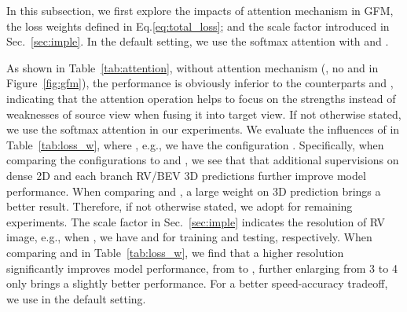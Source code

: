 In this subsection, we first explore the impacts of attention mechanism in GFM, the loss weights  defined in Eq.\ref{eq:total_loss}; and the scale factor  introduced in Sec.~\ref{sec:imple}. In the default setting, we use the softmax attention with  and .

As shown in Table~\ref{tab:attention}, without attention mechanism (\ie, no  and  in Figure~\ref{fig:gfm}), the performance  is obviously inferior to the counterparts  and , indicating that the attention operation helps to focus on the strengths instead of weaknesses of source view when fusing it into target view. If not otherwise stated, we use the softmax attention in our experiments.
We evaluate the influences of  in Table~\ref{tab:loss_w}, where , e.g., we have  the configuration . Specifically, when comparing the configurations  to  and , we see that that additional supervisions on dense 2D and each branch RV/BEV 3D predictions further improve model performance. When comparing  and , a large weight on 3D prediction  brings a better result. Therefore, if not otherwise stated, we adopt  for remaining experiments. The scale factor  in Sec.~\ref{sec:imple} indicates the resolution of RV image, e.g., when , we have  and  for training and testing, respectively. When comparing  and  in Table~\ref{tab:loss_w}, we find that a higher resolution significantly improves model performance, from  to , further enlarging  from 3 to 4 only brings a slightly better performance. For a better speed-accuracy tradeoff, we use  in the default setting.




